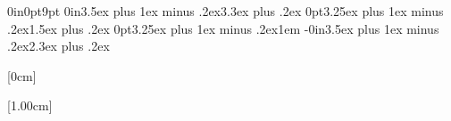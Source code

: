 \titlespacing*{\chapter} {0in}{0pt}{9pt}
\titlespacing*{\section} {0in}{3.5ex plus 1ex minus .2ex}{3.3ex plus .2ex}
\titlespacing*{\subsection} {0pt}{3.25ex plus 1ex minus .2ex}{1.5ex plus .2ex}
\titlespacing*{\paragraph} {0pt}{3.25ex plus 1ex minus .2ex}{1em}
\titlespacing*{\subparagraph} {-0in}{3.5ex plus 1ex minus .2ex}{2.3ex plus .2ex}

\renewcommand{\bottomtitlespace}{2.5in}



\newcommand{\setsection}[2]{%
  \setcounter{chapter}{#1}
  \setcounter{section}{#2}
  \addtocounter{section}{-1}

}



\usepackage{titletoc} %
\contentsmargin{0cm} %


[0cm]
{\addvspace{20pt}\centering\large\bfseries}
{}
{}
{}

[1.00cm] %
{\addvspace{5pt}\Large\sffamily\bfseries} %
{\color{maincolor}\contentslabel[\Large\thecontentslabel]{1.00cm}\color{maincolor}} %
{\color{maincolor}}
{\color{maincolor}\Large\;\;\thecontentspage} %

